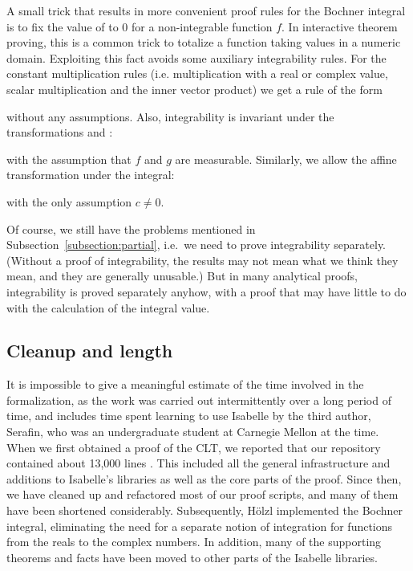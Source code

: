 \documentclass{svjour3}
\begin{document}
A small trick that results in more convenient proof rules for the Bochner integral is to fix the value of  to $0$ for a non-integrable function $f$. In interactive theorem proving, this is a common trick to totalize a function taking values in a numeric domain. Exploiting this fact avoids some auxiliary integrability rules. For the constant multiplication rules (i.e. multiplication with a real or complex value, scalar multiplication and the inner vector product) we get a rule of the form
\begin{quote}
\end{quote}
without any assumptions. Also, integrability is invariant under the transformations  and :
\begin{quote}
\end{quote}
with the assumption that $f$ and $g$ are measurable. Similarly, we allow the affine transformation under the integral:
\begin{quote}
\end{quote}
with the only assumption $c \not= 0$.

Of course, we still have the problems mentioned in Subsection~\ref{subsection:partial}, i.e.~we need to prove integrability separately. (Without a proof of integrability, the results may not mean what we think they mean, and they are generally unusable.) But in many analytical proofs, integrability is proved separately anyhow, with a proof that may have little to do with the calculation of the integral value.

\subsection{Cleanup and length}

It is impossible to give a meaningful estimate of the time involved in the formalization, as the work was carried out intermittently over a long period of time, and includes time spent learning to use Isabelle by the third author, Serafin, who was an undergraduate student at Carnegie Mellon at the time. When we first obtained a proof of the CLT, we reported that our repository contained about 13,000 lines \cite{avigad:hoelzl:serafin:14}. This included all the general infrastructure and additions to Isabelle's libraries as well as the core parts of the proof. Since then, we have cleaned up and refactored most of our proof scripts, and many of them have been shortened considerably. Subsequently, H\"olzl implemented the Bochner integral, eliminating the need for a separate notion of integration for functions from the reals to the complex numbers. In addition, many of the supporting theorems and facts have been moved to other parts of the Isabelle libraries.
\end{document}

